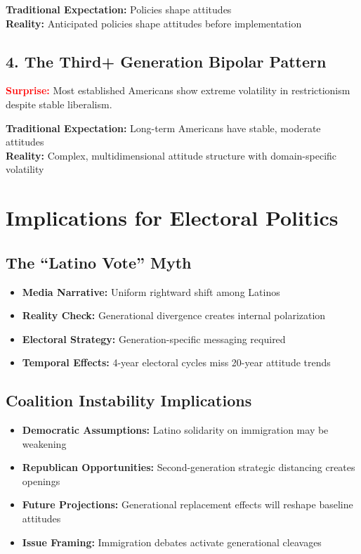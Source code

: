 \documentclass[11pt,letterpaper]{article}
\newcommand{\compactdesc}[2]{\item \textbf{#1:} #2}
\newcommand{\surprise}[1]{\textcolor{red}{\textbf{#1}}}
\begin{document}
\textbf{Traditional Expectation:} Policies shape attitudes\\
\textbf{Reality:} Anticipated policies shape attitudes before implementation

\subsection{4. The Third+ Generation Bipolar Pattern}
\surprise{\textbf{Surprise:}} Most established Americans show extreme volatility in restrictionism despite stable liberalism.

\textbf{Traditional Expectation:} Long-term Americans have stable, moderate attitudes\\
\textbf{Reality:} Complex, multidimensional attitude structure with domain-specific volatility

\section{Implications for Electoral Politics}

\subsection{The ``Latino Vote'' Myth}
\begin{itemize}
    \compactdesc{Media Narrative}{Uniform rightward shift among Latinos}
    \compactdesc{Reality Check}{Generational divergence creates internal polarization}
    \compactdesc{Electoral Strategy}{Generation-specific messaging required}
    \compactdesc{Temporal Effects}{4-year electoral cycles miss 20-year attitude trends}
\end{itemize}

\subsection{Coalition Instability Implications}
\begin{itemize}
    \item \textbf{Democratic Assumptions:} Latino solidarity on immigration may be weakening
    \item \textbf{Republican Opportunities:} Second-generation strategic distancing creates openings
    \item \textbf{Future Projections:} Generational replacement effects will reshape baseline attitudes
    \item \textbf{Issue Framing:} Immigration debates activate generational cleavages
\end{itemize}
\end{document}
